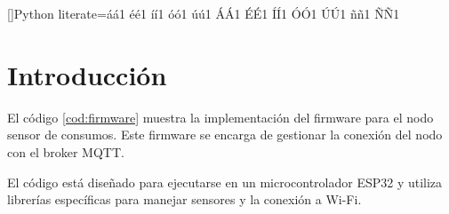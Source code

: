 []{Python}{
literate={á}{{\'a}}1 {é}{{\'e}}1 {í}{{\'i}}1 {ó}{{\'o}}1 {ú}{{\'u}}1
{Á}{{\'A}}1 {É}{{\'E}}1 {Í}{{\'I}}1 {Ó}{{\'O}}1 {Ú}{{\'U}}1
{ñ}{{\~n}}1 {Ñ}{{\~N}}1
}


\section{Introducción}


El código \ref{cod:firmware} muestra la implementación del firmware para el nodo
sensor de consumos. Este firmware se encarga de gestionar la conexión
del nodo con el broker MQTT.

El código está diseñado para ejecutarse en un microcontrolador ESP32 y utiliza
librerías específicas para manejar sensores y la conexión a Wi-Fi.



